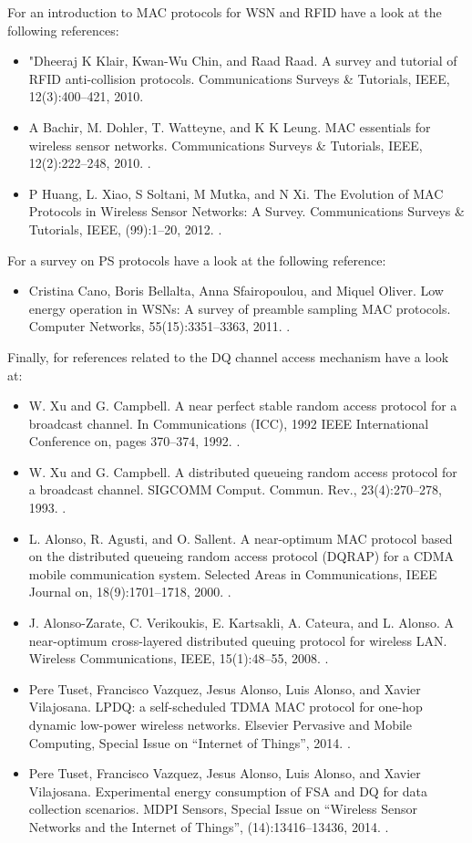 For an introduction to MAC protocols for WSN and RFID have a look at the following references:
\begin{itemize}
\item "Dheeraj K Klair, Kwan-Wu Chin, and Raad Raad. A survey and tutorial of RFID anti-collision protocols. Communications Surveys \& Tutorials, IEEE, 12(3):400–421, 2010. \cite{Klair2010}
\item A Bachir, M. Dohler, T. Watteyne, and K K Leung. MAC essentials for wireless sensor networks. Communications Surveys \& Tutorials, IEEE, 12(2):222–248, 2010. \cite{Bachir2010}.
\item P Huang, L. Xiao, S Soltani, M Mutka, and N Xi. The Evolution of MAC Protocols in Wireless Sensor Networks: A Survey. Communications Surveys \& Tutorials, IEEE, (99):1–20, 2012. \cite{Huang12}.
\end{itemize}

For a survey on PS protocols have a look at the following reference:
\begin{itemize}
\item Cristina Cano, Boris Bellalta, Anna Sfairopoulou, and Miquel Oliver. Low energy operation in WSNs: A survey of preamble sampling MAC protocols. Computer Networks, 55(15):3351–3363, 2011. \cite{Cano2011}.
\end{itemize}

Finally, for references related to the DQ channel access mechanism have a look at:
\begin{itemize}
\item W. Xu and G. Campbell. A near perfect stable random access protocol for a broadcast channel. In Communications (ICC), 1992 IEEE International Conference on, pages 370–374, 1992. \cite{Xu1992}.
\item W. Xu and G. Campbell. A distributed queueing random access protocol for a broadcast channel. SIGCOMM Comput. Commun. Rev., 23(4):270–278, 1993. \cite{Xu1993}.
\item L. Alonso, R. Agusti, and O. Sallent. A near-optimum MAC protocol based on the distributed queueing random access protocol (DQRAP) for a CDMA mobile communication system. Selected Areas in Communications, IEEE Journal on, 18(9):1701–1718, 2000. \cite{Alonso2000}.
\item J. Alonso-Zarate, C. Verikoukis, E. Kartsakli, A. Cateura, and L. Alonso. A near-optimum cross-layered distributed queuing protocol for wireless LAN. Wireless Communications, IEEE, 15(1):48–55, 2008. \cite{Alonso2008}.
\item Pere Tuset, Francisco Vazquez, Jesus Alonso, Luis Alonso, and Xavier Vilajosana. LPDQ: a self-scheduled TDMA MAC protocol for one-hop dynamic low-power wireless networks. Elsevier Pervasive and Mobile Computing, Special Issue on “Internet of Things”, 2014. \cite{Tuset2014a}.
\item Pere Tuset, Francisco Vazquez, Jesus Alonso, Luis Alonso, and Xavier Vilajosana. Experimental energy consumption of FSA and DQ for data collection scenarios. MDPI Sensors, Special Issue on “Wireless Sensor Networks and the Internet of Things”, (14):13416–13436, 2014. \cite{Tuset2014b}.
\end{itemize}